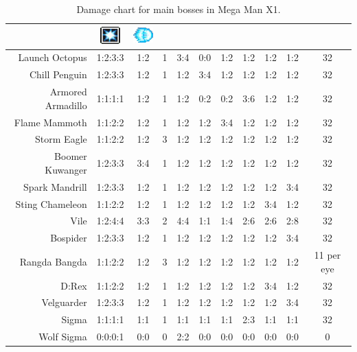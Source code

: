 \begin{table}[htp]
{\begin{tabular}{r *{10}{c}}
		&{\includegraphics[width=30px, height=25px]{figures/X1/weapons/S_ice.jpg}} &{\includegraphics[width=30px, height=25px]{figures/X1/weapons/hadoken_sprite.png}}\\
		\midrule
		Launch Octopus&	 	1:2:3:3& 1:2& 1 & 3:4& 0:0& 1:2& 1:2& 1:2& 1:2& 32\\
		Chill Penguin&	 	1:2:3:3& 1:2& 1 & 1:2& 3:4& 1:2& 1:2& 1:2& 1:2& 32\\
		Armored Armadillo& 	1:1:1:1& 1:2& 1 & 1:2& 0:2& 0:2& 3:6& 1:2& 1:2& 32\\
		Flame Mammoth& 		1:1:2:2& 1:2& 1 & 1:2& 1:2& 3:4& 1:2& 1:2& 1:2& 32\\
		Storm Eagle& 		1:1:2:2& 1:2& 3 & 1:2& 1:2& 1:2& 1:2& 1:2& 1:2& 32\\
		Boomer Kuwanger&	1:2:3:3& 3:4& 1 & 1:2& 1:2& 1:2& 1:2& 1:2& 1:2& 32\\
		Spark Mandrill&		1:2:3:3& 1:2& 1 & 1:2& 1:2& 1:2& 1:2& 1:2& 3:4& 32\\
		Sting Chameleon&	1:1:2:2& 1:2& 1 & 1:2& 1:2& 1:2& 1:2& 3:4& 1:2& 32\\
		Vile &				1:2:4:4& 3:3& 2 & 4:4& 1:1& 1:4& 2:6& 2:6& 2:8& 32\\
		Bospider&			1:2:3:3& 1:2& 1 & 1:2& 1:2& 1:2& 1:2& 1:2& 3:4& 32\\
		Rangda Bangda&		1:1:2:2& 1:2& 3 & 1:2& 1:2& 1:2& 1:2& 1:2& 1:2& 11 per eye\\
		D:Rex&				1:1:2:2& 1:2& 1 & 1:2& 1:2& 1:2& 1:2& 3:4& 1:2& 32\\
		Velguarder&			1:2:3:3& 1:2& 1 & 1:2& 1:2& 1:2& 1:2& 1:2& 3:4& 32\\
		Sigma&				1:1:1:1& 1:1& 1 & 1:1& 1:1& 1:1& 2:3& 1:1& 1:1& 32\\
		Wolf Sigma&			0:0:0:1& 0:0& 0 & 2:2& 0:0& 0:0& 0:0& 0:0& 0:0& 0\\
		\bottomrule
	\end{tabular}
	}	
	\caption{Damage chart for main bosses in Mega Man X1.}
\end{table}

\newpage
